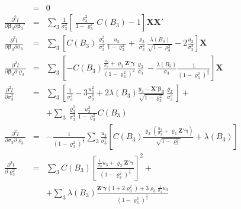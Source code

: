 \documentclass[a4paper]{article}
\begin{document}
\begin{eqnarray}
  &=& 0 \\
\frac{ \partial^2 l}{\partial\bm{\beta}_3 \partial\bm{\beta}_3'} &=&
  \sum_3 \frac{1}{\sigma_3^2} \left[
  \frac{\varrho_3^2}{1 - \varrho_3^2}C(B_3) - 1 \right]
  \bm{X}\bm{X}' \\
\frac{ \partial^2 l}{\partial\bm{\beta}_3 \partial\sigma_3} &=&
  \sum_3 \left[
    C(B_3) \frac{\varrho_3^2}{\sigma_3^3}
      \frac{u_3}{1 - \varrho_3^2}
    + \frac{\varrho_3}{\sigma_3^2}
      \frac{\lambda(B_3)}{\sqrt{1 - \varrho_3^2}}
    - 2\frac{u_3}{\sigma_3^3}
    \right] \bm{X} \\
\frac{ \partial^2 l}{\partial\bm{\beta}_3 \partial\varrho_3} &=&
  \sum_3 \left[
    -C(B_3) \frac
      {\displaystyle \frac{u_3}{\sigma_3} +
        \varrho_3\bm{Z}'\bm{\gamma}}
      {(1 - \varrho_3^2)^2}
      \frac{\varrho_3}{\sigma_3}
    - \frac{\lambda(B_3)}{\sigma_3}
      \frac{1}{(1 - \varrho_3^2)^\frac{3}{2}}
    \right] \bm{X}\\
\frac{ \partial^2 l}{\partial \sigma_3^2} &=&
  \sum_3 \left[
    \frac{1}{\sigma_3^2}
    - 3 \frac{ u_3^2}{\sigma_3^4}
    + 2 \lambda( B_3)
      \frac{y_3 - \bm{X}'\bm{\beta_3}}{\sqrt{1- \varrho_3^2}}
      \frac{\varrho_3}{\sigma_3^3}
    \right] + \nonumber\\
&&  + \sum_3
      \frac{\varrho_3^2}{\sigma_3^4}
      \frac{ u_3^2}{1 - \varrho_3^2}
      C(B_3) \\
\frac{ \partial^2 l}{\partial \sigma_3 \partial\varrho_3} &=&
  -\frac{1}{(1 - \varrho_3^2)^\frac{3}{2}}
  \sum_3  \frac{u_3}{\sigma_3^2} \left[
    C(B_3) \frac
      {\varrho_3 \left(
      \displaystyle \frac{u_3}{\sigma_3} +
        \varrho_3 \bm{Z}'\bm{\gamma} \right)}
      {\sqrt{1-\varrho_3^2}}
    + \lambda( B_3)
    \right]\\
\frac{ \partial^2 l}{\partial \varrho_3^2} &=&
  \sum_3
    C(B_3) \left[ \frac
      {\displaystyle \frac{1}{\sigma_3}u_3
        + \varrho_3 \bm{Z}'\bm{\gamma}}
      {( 1 - \varrho_3^2)^\frac{3}{2}}
      \right]^2 + \nonumber\\
&&  + \sum_3 \lambda( B_3)
      \frac
        {\bm{Z}'\bm{\gamma}( 1 + 2 \varrho_3^2) +
          3 \varrho_3 \displaystyle \frac{1}{\sigma_3} u_3}
        {(1-\varrho_3^2)^\frac{7}{2}}
%
\end{eqnarray}
\end{document}
